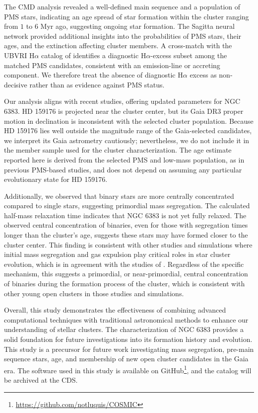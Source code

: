 \documentclass{aa}
\begin{document}
The CMD analysis revealed a well-defined main sequence and a population of PMS stars, indicating an age spread of star formation within the cluster ranging from $1$ to $6$ Myr ago, suggesting ongoing star formation. The Sagitta neural network provided additional insights into the probabilities of PMS stars, their ages, and the extinction affecting cluster members. A cross-match with the UBVRI H$\alpha$ catalog of \citet{2010AA...511A..25R} identifies a diagnostic H$\alpha$-excess subset among the matched PMS candidates, consistent with an emission-line or accreting component. We therefore treat the absence of diagnostic H$\alpha$ excess as non-decisive rather than as evidence against PMS status.

Our analysis aligns with recent studies, offering updated parameters for NGC 6383. HD 159176 is projected near the cluster center, but its Gaia DR3 proper motion in declination is inconsistent with the selected cluster population. Because HD 159176 lies well outside the magnitude range of the Gaia-selected candidates, we interpret its Gaia astrometry cautiously; nevertheless, we do not include it in the member sample used for the cluster characterization. The age estimate reported here is derived from the selected PMS and low-mass population, as in previous PMS-based studies, and does not depend on assuming any particular evolutionary state for HD 159176.

Additionally, we observed that binary stars are more centrally concentrated compared to single stars, suggesting primordial mass segregation. The calculated half-mass relaxation time indicates that NGC 6383 is not yet fully relaxed. The observed central concentration of binaries, even for those with segregation times longer than the cluster’s age, suggests these stars may have formed closer to the cluster center. This finding is consistent with other studies and simulations where initial mass segregation and gas expulsion play critical roles in star cluster evolution, which is in agreement with the studies of \citet{2007ApJ...655L..45M,2008MNRAS.386.2047M,2007AJ....134.1368C,2007MNRAS.381L..40D,2008AJ....135..173S}. Regardless of the specific mechanism, this suggests a primordial, or near-primordial, central concentration of binaries during the formation process of the cluster, which is consistent with other young open clusters in those studies and simulations.

Overall, this study demonstrates the effectiveness of combining advanced computational techniques with traditional astronomical methods to enhance our understanding of stellar clusters. The characterization of NGC 6383 provides a solid foundation for future investigations into its formation history and evolution. This study is a precursor for future work investigating mass segregation, pre-main sequence stars, age, and membership of new open cluster candidates in the Gaia era. The software used in this study is available on GitHub\footnote{\url{https://github.com/notluquis/COSMIC}}, and the catalog will be archived at the CDS.
\end{document}
